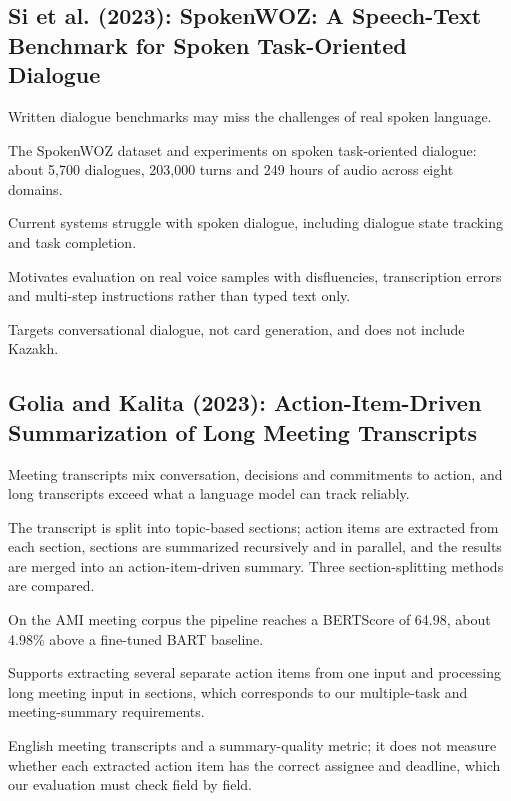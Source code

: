 \documentclass[11pt,a4paper]{article}
\newenvironment{sourceinfo}{\begin{description}[leftmargin=0pt,labelsep=0.5em,font=\normalfont\bfseries]}{\end{description}}
\newcommand{\source}[2]{\subsection{\texorpdfstring{#1~\cite{#2}}{#1}}}
\begin{document}
\source{Si et al. (2023): SpokenWOZ: A Speech-Text Benchmark for Spoken Task-Oriented Dialogue}{si2023spokenwoz}
\begin{sourceinfo}
  \item[Problem.] Written dialogue benchmarks may miss the challenges of real spoken language.
  \item[Method.] The SpokenWOZ dataset and experiments on spoken task-oriented dialogue: about 5{,}700 dialogues, 203{,}000 turns and 249 hours of audio across eight domains.
  \item[Reported findings.] Current systems struggle with spoken dialogue, including dialogue state tracking and task completion.
  \item[Relevance.] Motivates evaluation on real voice samples with disfluencies, transcription errors and multi-step instructions rather than typed text only.
  \item[Limitation.] Targets conversational dialogue, not card generation, and does not include Kazakh.
\end{sourceinfo}

\source{Golia and Kalita (2023): Action-Item-Driven Summarization of Long Meeting Transcripts}{golia2023action}
\begin{sourceinfo}
  \item[Problem.] Meeting transcripts mix conversation, decisions and commitments to action, and long transcripts exceed what a language model can track reliably.
  \item[Method.] The transcript is split into topic-based sections; action items are extracted from each section, sections are summarized recursively and in parallel, and the results are merged into an action-item-driven summary. Three section-splitting methods are compared.
  \item[Reported findings.] On the AMI meeting corpus the pipeline reaches a BERTScore of 64.98, about 4.98\% above a fine-tuned BART baseline.
  \item[Relevance.] Supports extracting several separate action items from one input and processing long meeting input in sections, which corresponds to our multiple-task and meeting-summary requirements.
  \item[Limitation.] English meeting transcripts and a summary-quality metric; it does not measure whether each extracted action item has the correct assignee and deadline, which our evaluation must check field by field.
\end{sourceinfo}
\end{document}
